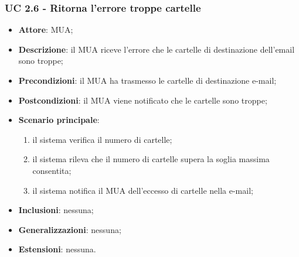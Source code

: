     \subsubsection{UC 2.6 - Ritorna l'errore troppe cartelle} \label{sec:UC2.6}
    \begin{itemize}
        \item \textbf{Attore}: MUA;
        \item \textbf{Descrizione}: il MUA riceve l'errore che le cartelle di destinazione dell'email sono troppe;
        \item \textbf{Precondizioni}: il MUA ha trasmesso le cartelle di destinazione e-mail;
        \item \textbf{Postcondizioni}: il MUA viene notificato che le cartelle sono troppe;
        \item \textbf{Scenario principale}:
            \begin{enumerate}
                \item il sistema verifica il numero di cartelle;
                \item il sistema rileva che il numero di cartelle supera la soglia massima consentita;
                \item il sistema notifica il MUA dell'eccesso di cartelle nella e-mail;
            \end{enumerate}
        \item \textbf{Inclusioni}: nessuna;
        \item \textbf{Generalizzazioni}: nessuna;
        \item \textbf{Estensioni}: nessuna.
    \end{itemize}
